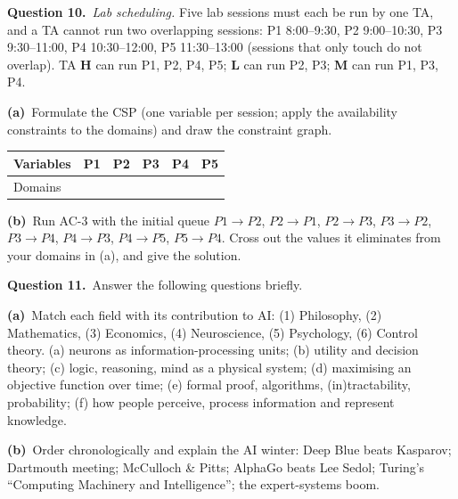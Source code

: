 \documentclass[11pt,a4paper]{article}
\newcommand{\question}[1]{\par\medskip\noindent\textbf{Question #1.}\ }
\newcommand{\subq}[1]{\par\smallskip\noindent\textbf{#1}\ }
\begin{document}
\question{10}\textit{Lab scheduling.} Five lab sessions must each be run by one TA, and a TA cannot run two overlapping sessions: P1 8:00--9:30, P2 9:00--10:30, P3 9:30--11:00, P4 10:30--12:00, P5 11:30--13:00 (sessions that only touch do not overlap). TA \textbf{H} can run P1, P2, P4, P5; \textbf{L} can run P2, P3; \textbf{M} can run P1, P3, P4.
\subq{(a)}Formulate the CSP (one variable per session; apply the availability constraints to the domains) and draw the constraint graph.
\begin{center}\small\begin{tabular}{|l|c|c|c|c|c|}\hline Variables & \textbf{P1} & \textbf{P2} & \textbf{P3} & \textbf{P4} & \textbf{P5}\\ \hline Domains &  &  &  &  & \\ \hline\end{tabular}\end{center}\begin{ansbox}[height=2.4cm]\end{ansbox}
\subq{(b)}Run AC-3 with the initial queue $P1\to P2$, $P2\to P1$, $P2\to P3$, $P3\to P2$, $P3\to P4$, $P4\to P3$, $P4\to P5$, $P5\to P4$. Cross out the values it eliminates from your domains in (a), and give the solution.
\begin{ansbox}[height=5.0cm]\end{ansbox}
\clearpage
\question{11}Answer the following questions briefly.
\subq{(a)}Match each field with its contribution to AI: (1) Philosophy, (2) Mathematics, (3) Economics, (4) Neuroscience, (5) Psychology, (6) Control theory. (a) neurons as information-processing units; (b) utility and decision theory; (c) logic, reasoning, mind as a physical system; (d) maximising an objective function over time; (e) formal proof, algorithms, (in)tractability, probability; (f) how people perceive, process information and represent knowledge.
\begin{ansbox}[height=1.0cm]\end{ansbox}
\subq{(b)}Order chronologically and explain the AI winter: Deep Blue beats Kasparov; Dartmouth meeting; McCulloch \& Pitts; AlphaGo beats Lee Sedol; Turing's ``Computing Machinery and Intelligence''; the expert-systems boom.
\begin{ansbox}[height=2.0cm]\end{ansbox}
\end{document}
